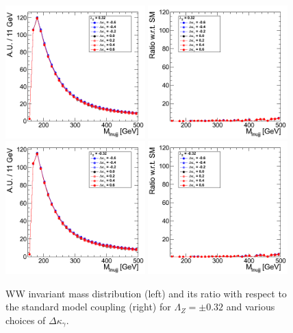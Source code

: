 \begin{figure}[h!t]
  {\centering
    \includegraphics[width=0.48\textwidth]{figs/Mass4Body_032.png}
    \includegraphics[width=0.48\textwidth]{figs/Mass4Body_032_ratio.png}
    \includegraphics[width=0.48\textwidth]{figs/Mass4Body_m032.png}
    \includegraphics[width=0.48\textwidth]{figs/Mass4Body_m032_ratio.png}
    \caption{WW invariant mass distribution (left) and its ratio with respect to 
    the standard model coupling (right) for $\Lambda_Z = \pm 0.32$ and various choices of $\Delta{\kappa_\gamma}$.}
    \label{fig:ww_Mass4Body_atgcRatio032}}
\end{figure}
